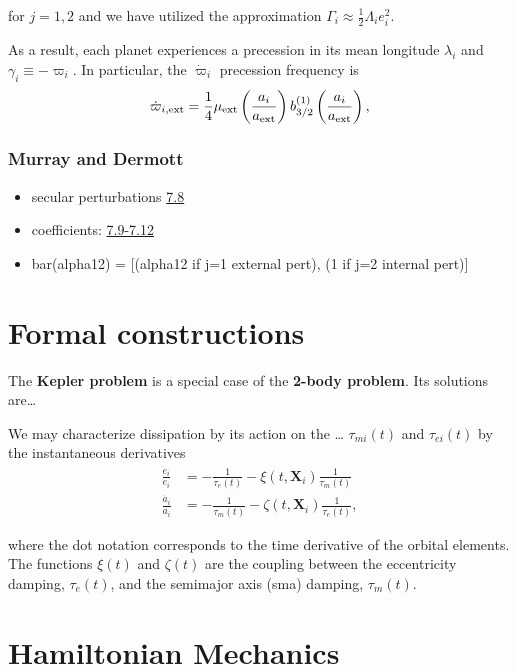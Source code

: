 \documentclass[11pt]{article}
\begin{document}
\noindent
for \(j=1,2\) and we have utilized the approximation \(\Gamma_i \approx \frac12 \Lambda_i e_i^2\).

As a result, each planet experiences a precession in its mean longitude \(\lambda_i\) and
\(\gamma_i\equiv -\varpi_i\). In particular, the \(\dot\varpi_i\) precession frequency
is
\begin{equation}
\dot\varpi_{i, \rm ext} = \frac14 \mu_{\rm ext} 
    \left(\frac{a_i}{a_{\rm ext}}\right) b_{3/2}^{(1)}\left(\frac{a_i}{a_{\rm ext}}\right),
\end{equation}

\subsubsection{Murray and Dermott}
\label{sec:orgd0f3cf3}
\begin{itemize}
\item secular perturbations \href{./images/screenshot-02.png}{7.8}
\item coefficients: \href{./images/screenshot-03.png}{7.9-7.12}
\item bar(alpha12) = [(alpha12 if j=1 external pert),  (1 if j=2 internal pert)]
\end{itemize}

\section{Formal constructions}
\label{sec:org69fa65e}
The \textbf{Kepler problem} is a special case of the \textbf{2-body problem}.
Its solutions are\ldots{}

We may characterize dissipation by its action on the \ldots{}
\(\tau_{mi}(t)\) and \(\tau_{ei}(t)\) by the instantaneous derivatives
\begin{align}
   \frac{\dot e_i}{e_i} &= - \frac{1}{\tau_e(t)} - \xi(t, \mathbf X_i)\frac{1}{\tau_m(t)} \\
   \frac{\dot a_i}{a_i} &= -\frac{1}{\tau_m(t)} - \zeta(t, \mathbf X_i)\frac{1}{\tau_e(t)},
\end{align}
\noindent

\noindent
where the dot notation corresponds to the time derivative of the
orbital elements. The functions \(\xi(t)\) and \(\zeta(t)\) are the
coupling between the eccentricity damping, \(\tau_e(t)\), and the
semimajor axis (sma) damping, \(\tau_m(t)\).

\section{Hamiltonian Mechanics}
\label{sec:orgb2076a0}
\end{document}
